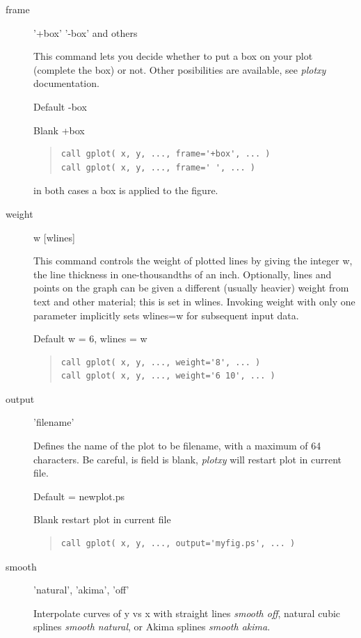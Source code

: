\documentclass{article}
\begin{document}
\begin{description}
\item[frame] '+box' '-box' and others

This command lets you decide whether to put a box on your plot (complete the box) or not. Other posibilities are available, see {\it plotxy} documentation.

Default -box

Blank +box
\begin{quote}
\begin{verbatim}
call gplot( x, y, ..., frame='+box', ... )
call gplot( x, y, ..., frame=' ', ... )
\end{verbatim}
\end{quote}
in both cases a box is applied to the figure.

\item[weight] w [wlines]

This command controls the weight of plotted lines by giving
the integer w, the line thickness in one-thousandths of an inch. Optionally, lines
and points on the graph can be given a different (usually heavier) weight from text
and other material; this is set in wlines. Invoking weight with only one parameter
implicitly sets wlines=w for subsequent input data.

Default w = 6, wlines = w

\begin{quote}
\begin{verbatim}
call gplot( x, y, ..., weight='8', ... )
call gplot( x, y, ..., weight='6 10', ... )
\end{verbatim}
\end{quote}

\item[output] 'filename'

Defines the name of the plot to be filename, with a maximum of 64 characters. Be careful, is field is blank, {\it plotxy} will restart plot in current file. 

Default = newplot.ps

Blank restart plot in current file
\begin{quote}
\begin{verbatim}
call gplot( x, y, ..., output='myfig.ps', ... )
\end{verbatim}
\end{quote}

\item[smooth] 'natural', 'akima', 'off'

Interpolate curves of y vs x with straight lines {\it smooth off}, natural cubic splines {\it smooth natural}, or Akima splines {\it smooth akima}.


\end{description}
\end{document}
